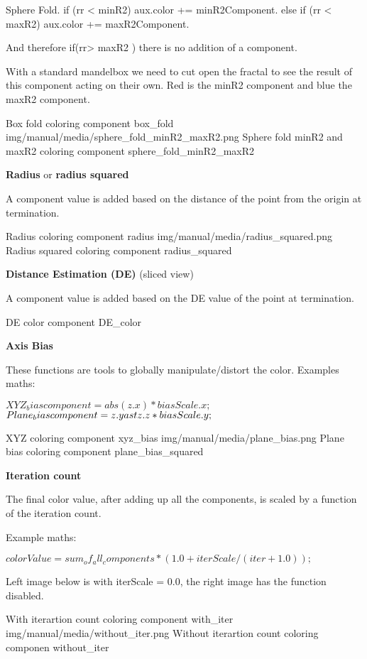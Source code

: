 Sphere Fold. 
if (rr < minR2)    aux.color +=  minR2Component.
else if (rr < maxR2)    aux.color +=  maxR2Component.

And therefore  if(rr> maxR2 ) there is no addition of a component.

With a standard mandelbox we need to cut open the fractal to see the result of this component acting on their own. Red is the minR2 component and blue the maxR2 component.


{Box fold coloring component}
{box_fold}
{img/manual/media/sphere_fold_minR2_maxR2.png}
{Sphere fold minR2 and maxR2 coloring component}
{sphere_fold_minR2_maxR2}


\textbf{Radius} or \textbf{radius squared} 

A  component value is added based on the distance of the point from the origin at termination.


{Radius coloring component}
{radius}
{img/manual/media/radius_squared.png}
{Radius squared coloring component}
{radius_squared}

\textbf{Distance Estimation (DE)}  (sliced view)

A  component value is added based on the DE value of the point at termination.

{DE color component}
{DE_color}

\textbf{Axis Bias}

These functions are tools to globally manipulate/distort the color. 
Examples maths:

$XYZ_bias                component = abs(z.x) \ast biasScale.x;$
$Plane_bias              component = z.y \\ast z.z \ast biasScale.y;$

{XYZ coloring component}
{xyz_bias}
{img/manual/media/plane_bias.png}
{Plane bias coloring component}
{plane_bias_squared}

\textbf{Iteration count}

The final color value, after adding up all the components, is  scaled by a function of the iteration count.

Example maths:

$colorValue =  sum_of_all_components *  ( 1.0 + iterScale / ( iter + 1.0));$

Left image below is with iterScale = 0.0, the right image has the function disabled.

{With iterartion count coloring component}
{with_iter}
{img/manual/media/without_iter.png}
{Without iterartion count coloring componen}
{without_iter}



